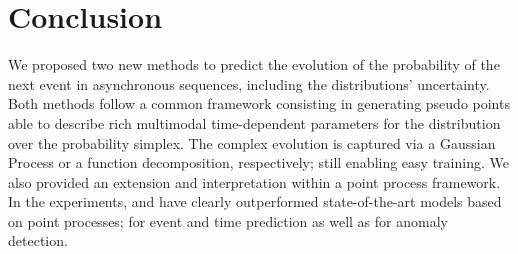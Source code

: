 \section{Conclusion}
\label{sec:conclusion_010}


We proposed two new methods to predict the evolution of the probability of the next event in asynchronous sequences, including the distributions' uncertainty. Both methods follow a common framework consisting in generating pseudo points able to describe rich multimodal time-dependent parameters for the distribution over the probability simplex. The complex evolution is captured via a Gaussian Process or a function decomposition, respectively; still enabling easy training. We also provided an extension and interpretation within a point process framework. In the experiments, \GPModel and \DirModel have clearly outperformed state-of-the-art models based on point processes; for event and time prediction as well as for anomaly detection.

